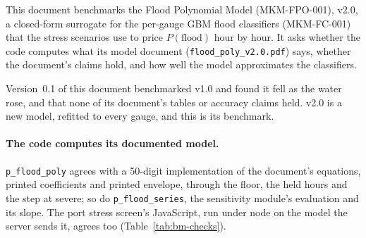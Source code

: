 \documentclass[11pt,a4paper]{article}
\begin{document}
\sloppy

\mkmtitlepage
\mkmlegalpage

\tableofcontents
\clearpage

\mkmexecsummary

This document benchmarks the Flood Polynomial Model (MKM-FPO-001), v2.0, a closed-form
surrogate for the per-gauge GBM flood classifiers (MKM-FC-001) that the stress scenarios
use to price $P(\text{flood})$ hour by hour. It asks whether the code computes what its
model document (\texttt{flood\_poly\_v2.0.pdf}) says, whether the document's claims
hold, and how well the model approximates the classifiers.

Version~0.1 of this document benchmarked v1.0 and found it fell as the water rose, and
that none of its document's tables or accuracy claims held. v2.0 is a new model, refitted
to every gauge, and this is its benchmark.

\paragraph{The code computes its documented model.} \texttt{p\_flood\_poly} agrees with
a 50-digit implementation of the document's equations, printed coefficients and printed
envelope, through the floor, the held hours and the step at severe; so do
\texttt{p\_flood\_series}, the sensitivity module's evaluation and its slope. The port
stress screen's JavaScript, run under node on the model the server sends it, agrees too
(Table~\ref{tab:bm-checks}). \bmWolframConfirms
\end{document}
